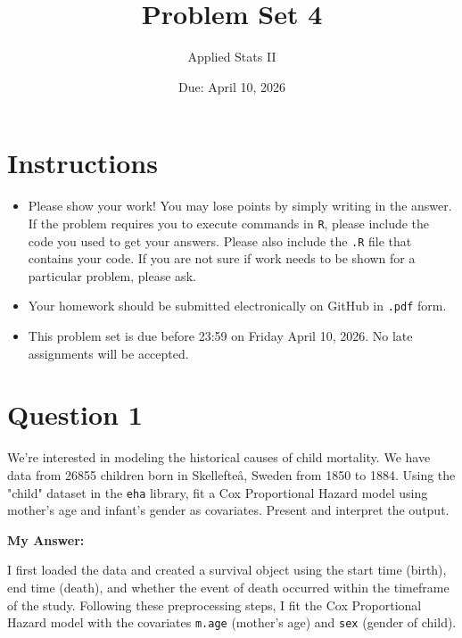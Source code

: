 \documentclass[12pt,letterpaper]{article}
\title{Problem Set 4}
\date{Due: April 10, 2026}
\author{Applied Stats II}
\begin{document}
	\maketitle
	\section*{Instructions}
	\begin{itemize}
	\item Please show your work! You may lose points by simply writing in the answer. If the problem requires you to execute commands in \texttt{R}, please include the code you used to get your answers. Please also include the \texttt{.R} file that contains your code. If you are not sure if work needs to be shown for a particular problem, please ask.
	\item Your homework should be submitted electronically on GitHub in \texttt{.pdf} form.
	\item This problem set is due before 23:59 on Friday April 10, 2026. No late assignments will be accepted.

	\end{itemize}

	\vspace{.25cm}
\section*{Question 1}
\vspace{.25cm}
\noindent We're interested in modeling the historical causes of child mortality. We have data from 26855 children born in Skellefteå, Sweden from 1850 to 1884. Using the "child" dataset in the \texttt{eha} library, fit a Cox Proportional Hazard model using mother's age and infant's gender as covariates. Present and interpret the output.

	\vspace{0.5cm}

	\noindent\textbf{My Answer:}

	I first loaded the data and created a survival object using the start time (birth), end time (death), and whether the event of death occurred within the timeframe of the study. Following these preprocessing steps, I fit the Cox Proportional Hazard model with the covariates \texttt{m.age} (mother's age) and \texttt{sex} (gender of child).
	
	
\end{document}
